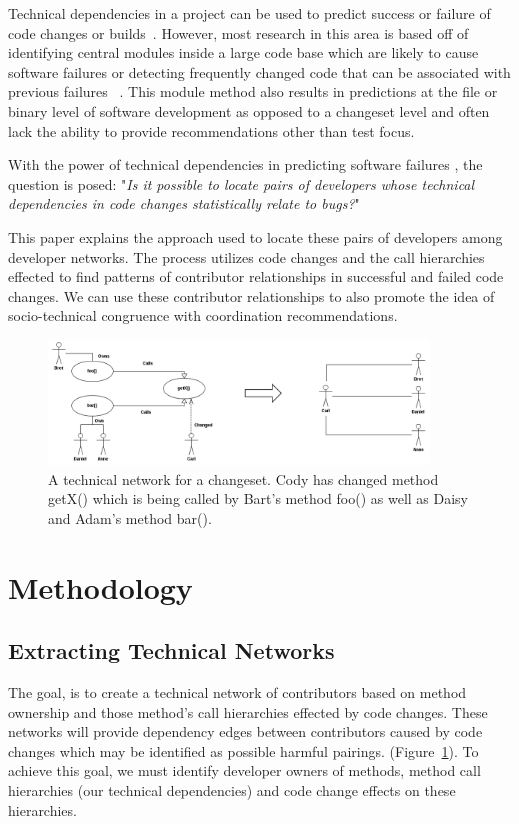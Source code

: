 \documentclass[conference]{IEEEtran}
\begin{document}
Technical dependencies in a project can be used to predict success or failure of 
code changes or builds~\cite{Pinzger:2008:DNP, Zimmermann:2008:PDU}. However, most 
research in this area is based off of identifying
central modules inside a large code base which are likely to cause software failures or
detecting frequently changed code that can be associated with previous failures
~\cite{Kim:2006:AIB}. 
This module method also results in predictions 
at the file or binary level of software development as opposed to a changeset level
and often lack the ability to provide recommendations other than test focus.

With the power of technical dependencies in predicting software failures , the question is posed: 
"\textit{Is it possible to locate pairs of developers whose technical dependencies in code changes
statistically relate to bugs?}"

This paper explains the approach used to locate these pairs of developers among developer networks.
The process utilizes code changes and the call hierarchies effected  to find patterns of contributor 
relationships in successful and failed code changes.  We can use these contributor relationships 
to also promote the idea of socio-technical congruence with coordination recommendations.

\begin{figure}[tb!]
\centering
\includegraphics[width=0.9\textwidth]{images/TecNetwork}
\caption{A technical network for a changeset. Cody has changed method getX() which is being
called by Bart's method foo() as well as Daisy and Adam's method bar().\label{fig:network}}
\end{figure}

\section{Methodology}

\subsection{Extracting Technical Networks}
The goal, is to create a technical network of contributors based on method ownership
and those method's call hierarchies effected by code changes. These networks will provide
dependency edges between contributors caused by code changes which may be 
identified as possible harmful pairings. (Figure~\ref{fig:network}). To achieve this goal,
we must identify developer owners of methods, method call hierarchies (our technical
dependencies) and code change effects on these hierarchies.
\end{document}
